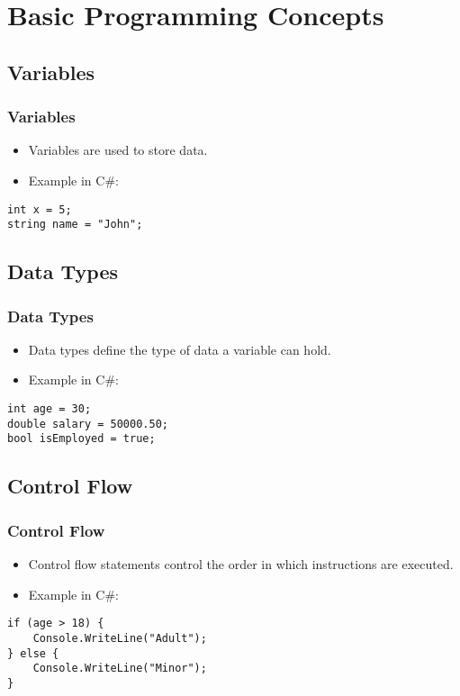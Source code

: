 \section{Basic Programming Concepts}

\subsection{Variables}
\begin{frame}[fragile]
\frametitle{Variables}
\begin{itemize}
    \item Variables are used to store data.
    \item Example in C\#:
\end{itemize}
\begin{verbatim}
int x = 5;
string name = "John";
\end{verbatim}
\end{frame}

\subsection{Data Types}
\begin{frame}[fragile]
\frametitle{Data Types}
\begin{itemize}
    \item Data types define the type of data a variable can hold.
    \item Example in C\#:
\end{itemize}
\begin{verbatim}
int age = 30;
double salary = 50000.50;
bool isEmployed = true;
\end{verbatim}
\end{frame}

\subsection{Control Flow}
\begin{frame}[fragile]
\frametitle{Control Flow}
\begin{itemize}
    \item Control flow statements control the order in which instructions are executed.
    \item Example in C\#:
\end{itemize}
\begin{verbatim}
if (age > 18) {
    Console.WriteLine("Adult");
} else {
    Console.WriteLine("Minor");
}
\end{verbatim}
\end{frame}
